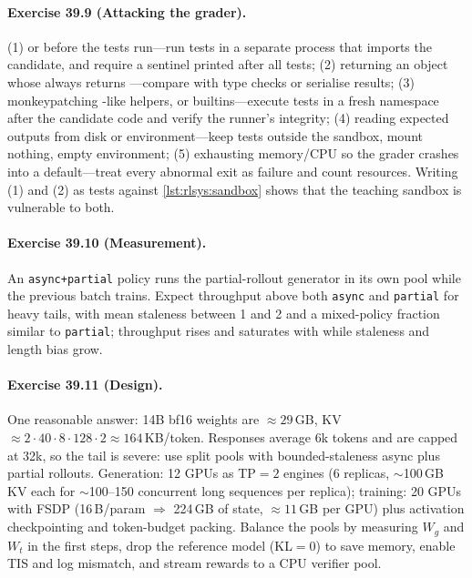 \paragraph{Exercise 39.9 (Attacking the grader).}
(1)  or  before the tests run---run tests in a separate process
that imports the candidate, and require a sentinel printed after all tests; (2) returning an object
whose  always returns ---compare with type checks or serialise results;
(3) monkeypatching -like helpers,  or builtins---execute tests in a fresh
namespace after the candidate code and verify the runner's integrity; (4) reading expected outputs
from disk or environment---keep tests outside the sandbox, mount nothing, empty environment;
(5) exhausting memory/CPU so the grader crashes into a default---treat every abnormal exit as failure
and count resources. Writing (1) and (2) as tests against \cref{lst:rlsys:sandbox} shows that the
teaching sandbox is vulnerable to both.

\paragraph{Exercise 39.10 (Measurement).}
An \texttt{async+partial} policy runs the partial-rollout generator in its own pool while the
previous batch trains. Expect throughput above both \texttt{async} and \texttt{partial} for heavy
tails, with mean staleness between 1 and 2 and a mixed-policy fraction similar to \texttt{partial};
throughput rises and saturates with  while staleness and length bias grow.

\paragraph{Exercise 39.11 (Design).}
One reasonable answer: 14B bf16 weights are $\approx29$\,GB, KV $\approx 2\cdot40\cdot8\cdot128\cdot2
\approx164$\,KB/token. Responses average 6k tokens and are capped at 32k, so the tail is severe:
use split pools with bounded-staleness async plus partial rollouts. Generation: 12 GPUs as TP$=2$
engines (6 replicas, $\sim$100\,GB KV each for $\sim$100--150 concurrent long sequences per replica);
training: 20 GPUs with FSDP (16\,B/param $\Rightarrow$ 224\,GB of state, $\approx11$\,GB per GPU) plus
activation checkpointing and token-budget packing. Balance the pools by measuring $W_g$ and $W_t$
in the first steps, drop the reference model (KL$=0$) to save memory, enable TIS and log mismatch,
and stream rewards to a CPU verifier pool.
